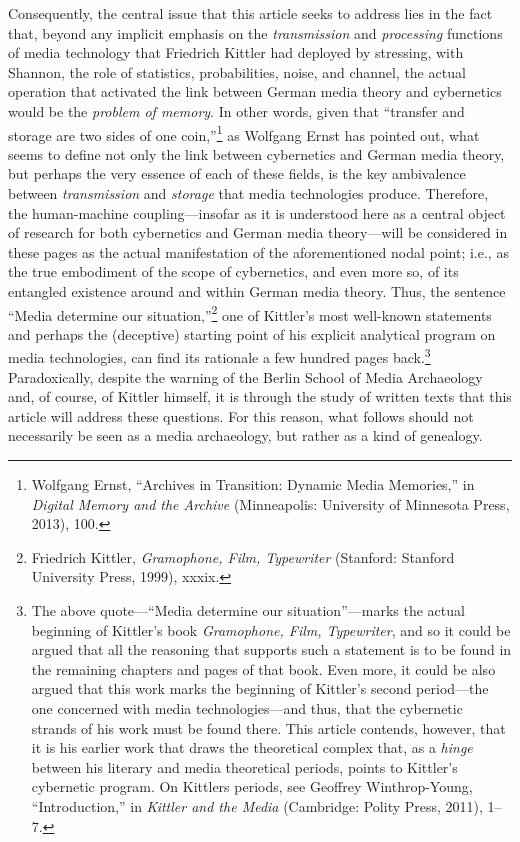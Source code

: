 \documentclass{tufte-handout}
\begin{document}
Consequently, the central issue that this article seeks to address lies
in the fact that, beyond any implicit emphasis on the
\emph{transmission} and \emph{processing} functions of media technology
that Friedrich Kittler had deployed by stressing, with Shannon, the role
of statistics, probabilities, noise, and channel, the actual operation
that activated the link between German media theory and cybernetics
would be the \emph{problem of memory}. In other words, given that
``transfer and storage are two sides of one coin,''\footnote{Wolfgang
  Ernst, ``Archives in Transition: Dynamic Media Memories,'' in
  \emph{Digital Memory and the Archive} (Minneapolis: University of
  Minnesota Press, 2013), 100.} as Wolfgang Ernst has pointed out, what
seems to define not only the link between cybernetics and German media
theory, but perhaps the very essence of each of these fields, is the key
ambivalence between \emph{transmission} and \emph{storage} that media
technologies produce. Therefore, the human-machine coupling---insofar as
it is understood here as a central object of research for both
cybernetics and German media theory---will be considered in these pages
as the actual manifestation of the aforementioned nodal point; i.e., as
the true embodiment of the scope of cybernetics, and even more so, of
its entangled existence around and within German media theory. Thus, the
sentence ``Media determine our situation,''\footnote{Friedrich Kittler,
  \emph{Gramophone, Film, Typewriter} (Stanford: Stanford University
  Press, 1999), xxxix.} one of Kittler's most well-known statements and
perhaps the (deceptive) starting point of his explicit analytical
program on media technologies, can find its rationale a few hundred
pages back.\footnote{The above quote---``Media determine our
  situation''---marks the actual beginning of Kittler's book
  \emph{Gramophone, Film, Typewriter}, and so it could be argued that
  all the reasoning that supports such a statement is to be found in the
  remaining chapters and pages of that book. Even more, it could be also
  argued that this work marks the beginning of Kittler's second
  period---the one concerned with media technologies---and thus, that
  the cybernetic strands of his work must be found there. This article
  contends, however, that it is his earlier work that draws the
  theoretical complex that, as a \emph{hinge} between his literary and
  media theoretical periods, points to Kittler's cybernetic program. On
  Kittler\textquotesingle s periods, see Geoffrey Winthrop-Young,
  ``Introduction,'' in \emph{Kittler and the Media} (Cambridge: Polity
  Press, 2011), 1--7.} Paradoxically, despite the warning of the Berlin
School of Media Archaeology and, of course, of Kittler himself, it is
through the study of written texts that this article will address these
questions. For this reason, what follows should not necessarily be seen
as a media archaeology, but rather as a kind of genealogy.
\end{document}
